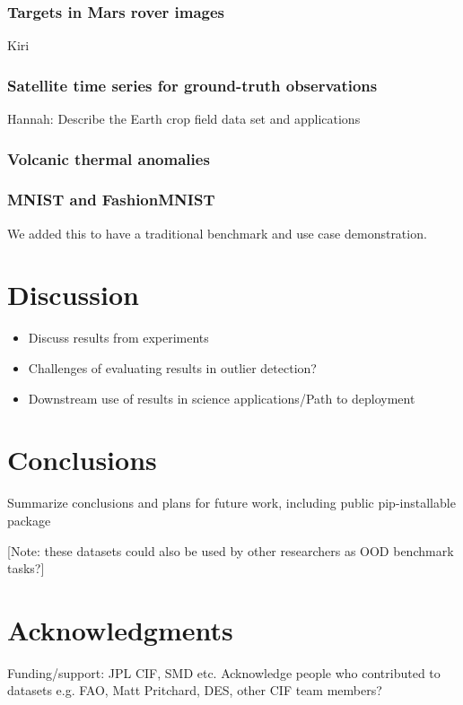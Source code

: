 \documentclass[letterpaper]{article} %
\begin{document}
\subsubsection{Targets in Mars rover images}
Kiri

\subsubsection{Satellite time series for ground-truth observations}
Hannah: Describe the Earth crop field data set and applications

\subsubsection{Volcanic thermal anomalies}

\subsubsection{MNIST and FashionMNIST}
We added this to have a traditional benchmark and use case demonstration. 


\section{Discussion}
\begin{itemize}
\item Discuss results from experiments
\item Challenges of evaluating results in outlier detection?
\item Downstream use of results in science applications/Path to deployment
\end{itemize}

\section{Conclusions}
Summarize conclusions and plans for future work, including public 
pip-installable package

[Note: these datasets could also be used by other researchers as OOD
 benchmark tasks?]





\section{ Acknowledgments}
Funding/support: JPL CIF, SMD etc. Acknowledge people who contributed to 
datasets e.g. FAO, Matt Pritchard, DES, other CIF team members?
\end{document}
